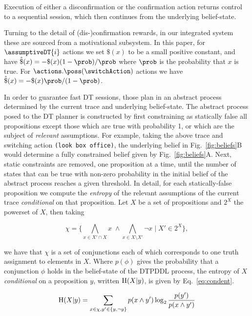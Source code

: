 \noindent Execution of either a disconfirmation or the confirmation action
returns control to a sequential session, which then continues from the
underlying belief-state.

Turning to the detail of (dis-)confirmation rewards, in our integrated
system these are sourced from a motivational subsystem. In this paper,
for $\assumptiveDT{i}$ actions we set $\$(x)$ to be a small positive
constant, and have $\hat\$(x)= - \$(x)(1 - \prob) /
\prob$ where $\prob$ is the probability that $x$ is true. For
$\actions.\poss(\switchAction)$ actions we have $\hat\$(x)= -
\$(x)\prob/(1-\prob)$.


In order to guarantee fast DT sessions, those plan in an abstract
process determined by the current trace and underlying belief-state.
The abstract process posed to the DT planner is constructed by first
constraining as statically false all propositions except those which
are true with probability 1, or which are the subject of {\em
  relevant} assumptions. For example, taking the above trace and
switching action {\texttt \mbox{(look~box~office)}}, the underlying
belief in Fig.~\ref{fig:beliefs}B would determine a fully constrained
belief given by Fig.~\ref{fig:beliefs}A.  Next, static constraints are
removed, one proposition at a time, until the number of states that
can be true with non-zero probability in the initial belief of the
abstract process reaches a given threshold.  In detail, for each
statically-false proposition we compute the {\em entropy} of the
relevant assumptions of the current trace {\em conditional} on that
proposition.  Let $X$ be a set of propositions and $2^X$ the powerset
of $X$, then taking


\small
\[
\chi = \{\bigwedge_{x \in X'
  \cap X}x \; \land \bigwedge_{x \in X \setminus X'}\neg x \;|\; X' \in 2^X\},
\]
\normalsize

\noindent we have that $\chi$ is a set of conjunctions each of which
corresponds to one truth assignment to elements in $X$. Where
$p(\phi)$ gives the probability that a conjunction $\phi$ holds in the
belief-state of the DTPDDL process, the entropy of $X$
\emph{conditional} on a proposition $y$, written $\mathrm{H}(X|y)$, is
given by Eq.~\ref{eq:condent}.

\vspace{-1ex}
\small
\begin{equation}\label{eq:condent}
  \mathrm{H}(X|y) = \sum_{x \in \chi, y' \in \{y, \neg y\}} p(x \land y') \log_2
  \frac{p(y')}{p(x \land y')}
\end{equation}
\normalsize

